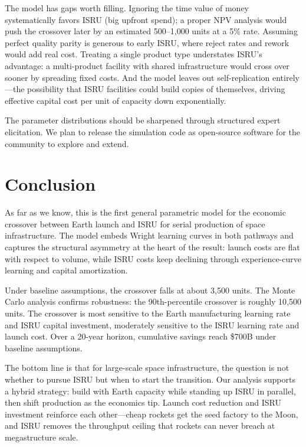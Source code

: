 \documentclass[preprint,12pt]{elsarticle}
\begin{document}
The model has gaps worth filling. Ignoring the time value of money systematically favors ISRU (big upfront spend); a proper NPV analysis would push the crossover later by an estimated 500--1{,}000 units at a 5\% rate. Assuming perfect quality parity is generous to early ISRU, where reject rates and rework would add real cost. Treating a single product type understates ISRU's advantage: a multi-product facility with shared infrastructure would cross over sooner by spreading fixed costs. And the model leaves out self-replication entirely---the possibility that ISRU facilities could build copies of themselves, driving effective capital cost per unit of capacity down exponentially.

The parameter distributions should be sharpened through structured expert elicitation. We plan to release the simulation code as open-source software for the community to explore and extend.

\section{Conclusion}
\label{sec:conclusion}

As far as we know, this is the first general parametric model for the economic crossover between Earth launch and ISRU for serial production of space infrastructure. The model embeds Wright learning curves in both pathways and captures the structural asymmetry at the heart of the result: launch costs are flat with respect to volume, while ISRU costs keep declining through experience-curve learning and capital amortization.

Under baseline assumptions, the crossover falls at about 3{,}500 units. The Monte Carlo analysis confirms robustness: the 90th-percentile crossover is roughly 10{,}500 units. The crossover is most sensitive to the Earth manufacturing learning rate and ISRU capital investment, moderately sensitive to the ISRU learning rate and launch cost. Over a 20-year horizon, cumulative savings reach \$700B under baseline assumptions.

The bottom line is that for large-scale space infrastructure, the question is not whether to pursue ISRU but when to start the transition. Our analysis supports a hybrid strategy: build with Earth capacity while standing up ISRU in parallel, then shift production as the economics tip. Launch cost reduction and ISRU investment reinforce each other---cheap rockets get the seed factory to the Moon, and ISRU removes the throughput ceiling that rockets can never breach at megastructure scale.
\end{document}
